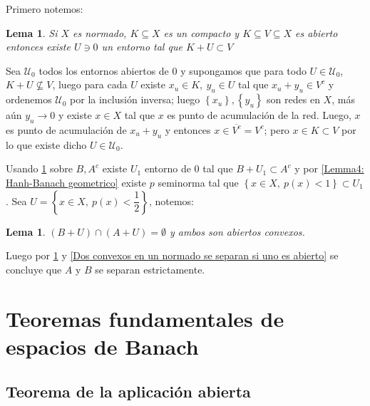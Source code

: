 \documentclass[11pt]{article}
\newcommand{\sett}[1]{\left\lbrace#1\right\rbrace}
\numberwithin{theorem}{subsection}
\newtheorem{lemma}[theorem]{Lema}
\newenvironment{proof}[1][Demostraci\'on]{\begin{trivlist}
		\item[\hskip \labelsep {\bfseries #1}]}{\end{trivlist}}
\newcommand{\qed}{\nobreak \ifvmode \relax \else
	\ifdim\lastskip<1.5em \hskip-\lastskip
	\hskip1.5em plus0em minus0.5em \fi \nobreak
	\vrule height0.75em width0.5em depth0.25em\fi}
\begin{document}
\begin{proof}
	Primero notemos:

\begin{lemma}
	\label{Lemma1: Un cerrado se separa de un compacto}
	Si $X$ es normado, $K \subseteq X$ es un compacto y $K \subseteq V \subseteq X$ es abierto entonces existe $U \ni 0$ un entorno tal que $K + U \subset V$
\end{lemma}

\begin{proof}[Demostraci\'on del lema]
	Sea $\mathcal{U}_0$ todos los entornos abiertos de $0$ y supongamos que para todo $U \in \mathcal{U}_0$, $K+U \not \subseteq V$, luego para cada $U$ existe $x_u \in K, \ y_u \in U$ tal que $x_u+y_u \in V^{c}$ y ordenemos $\mathcal{U}_0$ por la inclusi\'on inversa; luego $\sett{x_u},\sett{y_u}$ son redes en $X$, m\'as a\'un $y_u \rightarrow 0$ y existe $x \in X$ tal que $x$ es punto de acumulaci\'on de la red. Luego, $x$ es punto de acumulaci\'on de $x_u+y_u$ y entonces $x \in \overline{V^{c}} = V^{c}$; pero $x \in K \subset V$ por lo que existe dicho $U \in \mathcal{U}_0$. \qed
\end{proof}

Usando \ref{Lemma1: Un cerrado se separa de un compacto} sobre $B, A^{c}$ existe $U_1$ entorno de $0$ tal que $B+U_1 \subset A^c$ y por \ref{Lemma4: Hanh-Banach geometrico} existe $p$ seminorma tal que $\sett{x \in X, \ p(x) < 1} \subset U_1$. Sea $U = \sett{x \in X, \ p(x) < \dfrac{1}{2}}$, notemos:

\begin{lemma}
	\label{Lemma2: Un cerrado se separa de un compacto}
	 $\left(B+U\right)\cap \left(A + U\right) = \emptyset$ y ambos son abiertos convexos.
\end{lemma}

Luego por \ref{Lemma2: Un cerrado se separa de un compacto} y \ref{Dos convexos en un normado se separan si uno es abierto} se concluye que $A$ y $B$ se separan estrictamente.

\end{proof}


\section{Teoremas fundamentales de espacios de Banach}

\subsection{Teorema de la aplicaci\'on abierta}
\end{document}
